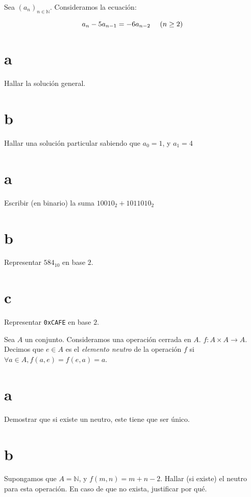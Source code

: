 
Sea $(a_n)_{n \in \mathbb{N}}$.
Consideramos la ecuaci\'on:

$$a_n - 5a_{n-1} = -6a_{n-2} \hbox{ ~~ } (n \geq 2)$$

\part{a}
Hallar la soluci\'on general.

\part{b}
Hallar una soluci\'on particular sabiendo que $a_0 = 1$, y $ a_1 = 4$



\part{a}
Escribir (en binario) la suma $10010_2 + 1011010_2$

\part{b}
Representar $584_{10}$ en base $2$.

\part{c}
Representar {\tt 0xCAFE} en base $2$.


Sea $A$ un conjunto. Consideramos una operaci\'on cerrada en $A$.
$f : A \times A \rightarrow A$.
Decimos que $e \in A$ es el {\it elemento neutro} de la operaci\'on $f$ si
$\forall a \in A, f(a,e) = f(e,a) = a$.

\part{a}
Demostrar que si existe un neutro, este tiene que ser \'unico.

\part{b}
Supongamos que $A = \mathbb{N}$, y $f(m,n) = m+n-2$.
Hallar (si existe) el neutro para esta operaci\'on. En caso de que no exista,
justificar por qu\'e.

\eject

\bye


